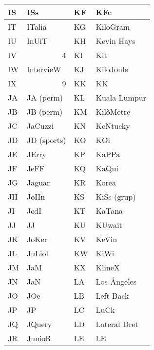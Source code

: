 \begin{table}[h]
    \centering
    \begin{tabular}{|l|l|l|l|}
    \hline
    IS & ISs                    & KF & KFc            \\ \hline
    IT & ITalia                 & KG & KiloGram       \\ \hline
    IU & InUiT                  & KH & Kevin Hays     \\ \hline
    IV & \multicolumn{1}{r|}{4} & KI & Kit            \\ \hline
    IW & IntervieW              & KJ & KiloJoule      \\ \hline
    IX & \multicolumn{1}{r|}{9} & KK & KK             \\ \hline
    JA & JA (perm)              & KL & Kuala Lumpur   \\ \hline
    JB & JB (perm)              & KM & KilòMetre      \\ \hline
    JC & JaCuzzi                & KN & KeNtucky       \\ \hline
    JD & JD (sports)            & KO & KOi            \\ \hline
    JE & JErry                  & KP & KaPPa          \\ \hline
    JF & JeFF                   & KQ & KaQui          \\ \hline
    JG & Jaguar                 & KR & Korea          \\ \hline
    JH & JoHn                   & KS & KiSs  (grup)   \\ \hline
    JI & JedI                   & KT & KaTana         \\ \hline
    JJ & JJ                     & KU & KUwait         \\ \hline
    JK & JoKer                  & KV & KeVin          \\ \hline
    JL & JuLiol                 & KW & KiWi           \\ \hline
    JM & JaM                    & KX & KlineX         \\ \hline
    JN & JaN                    & LA & Los Ángeles    \\ \hline
    JO & JOe                    & LB & Left Back      \\ \hline
    JP & JP                     & LC & LuCk           \\ \hline
    JQ & JQuery                 & LD & Lateral Dret   \\ \hline
    JR & JunioR                 & LE & LE             \\ \hline

\end{tabular}
\end{table}
